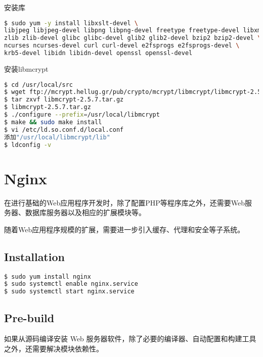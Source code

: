安装库


\begin{lstlisting}[language=bash]
$ sudo yum -y install libxslt-devel \
libjpeg libjpeg-devel libpng libpng-devel freetype freetype-devel libxml2 libxml2-devel \
zlib zlib-devel glibc glibc-devel glib2 glib2-devel bzip2 bzip2-devel \
ncurses ncurses-devel curl curl-devel e2fsprogs e2fsprogs-devel \
krb5-devel libidn libidn-devel openssl openssl-devel
\end{lstlisting}

安装libmcrypt


\begin{lstlisting}[language=bash]
$ cd /usr/local/src
$ wget ftp://mcrypt.hellug.gr/pub/crypto/mcrypt/libmcrypt/libmcrypt-2.5.7.tar.gz
$ tar zxvf libmcrypt-2.5.7.tar.gz
$ libmcrypt-2.5.7.tar.gz
$ ./configure --prefix=/usr/local/libmcrypt
$ make && sudo make install
$ vi /etc/ld.so.conf.d/local.conf
添加"/usr/local/libmcrypt/lib"
$ ldconfig -v
\end{lstlisting}





\section{Nginx}



在进行基础的Web应用程序开发时，除了配置PHP等程序库之外，还需要Web服务器、数据库服务器以及相应的扩展模块等。

随着Web应用程序规模的扩展，需要进一步引入缓存、代理和安全等子系统。





\subsection{Installation}


\begin{lstlisting}[language=bash]
$ sudo yum install nginx
$ sudo systemctl enable nginx.service
$ sudo systemctl start nginx.service
\end{lstlisting}

\subsection{Pre-build}


如果从源码编译安装 Web 服务器软件，除了必要的编译器、自动配置和构建工具之外，还需要解决模块依赖性。


